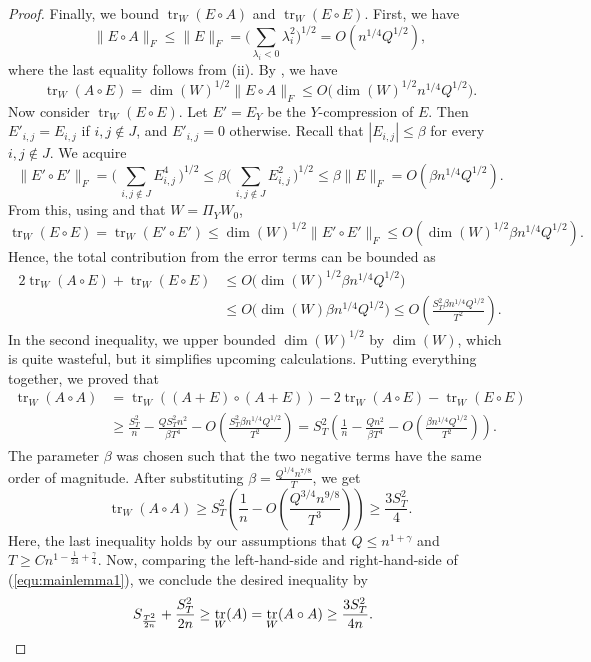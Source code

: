 \documentclass[10pt,a4paper]{amsart}
\DeclareMathOperator{\trace}{tr}
\begin{document}
\begin{proof}
Finally, we bound $\trace_W(E\circ A)$ and $\trace_W(E\circ E)$. First, we have 
$$\|E\circ A\|_F\leq \|E\|_F=\bigg(\sum_{\lambda_i<0}\lambda_i^2\bigg)^{1/2}=O(n^{1/4}Q^{1/2}),$$
where the last equality follows from  (ii). 
By , we have
$$\trace_W(A\circ E)=\dim(W)^{1/2} \|E\circ A\|_F\leq O\big(\dim(W)^{1/2}n^{1/4}Q^{1/2}\big).$$
Now consider $\trace_W(E\circ E)$.
Let $E'=E_Y$ be the $Y$-compression of $E$.
Then $E'_{i,j}=E_{i,j}$ if $i,j\not\in J$, and $E'_{i,j}=0$ otherwise. 
Recall that $|E_{i,j}| \le \beta$ for every $i,j \notin J$. We acquire
\begin{equation} \nonumber
    \|E'\circ E'\|_F
    =\bigg(\,\sum_{i,j\not\in J} E_{i,j}^4\,\bigg)^{1/2}
    \leq \beta \bigg(\,\sum_{i,j\not\in J}E_{i,j}^2\,\bigg)^{1/2}
    \leq \beta \|E\|_F=O(\beta n^{1/4}Q^{1/2}).
\end{equation}
From this, using  and that $W=\Pi_{Y} W_0$,
$$\trace_W(E\circ E)=\trace_W(E'\circ E')
    \leq \dim(W)^{1/2}\|E'\circ E'\|_F
    \leq O(\dim(W)^{1/2}\beta n^{1/4}Q^{1/2}).$$
Hence, the total contribution from the error terms can be bounded as
\begin{align*}
    2\trace_W(A\circ E)+\trace_W(E\circ E)
    &\leq O\big(\dim(W)^{1/2}\beta n^{1/4}Q^{1/2} \big)\\
    &\leq  O\big(\dim(W)\beta n^{1/4}Q^{1/2} \big)
    \leq O\!\left(\frac{S_T^2\beta n^{1/4}Q^{1/2}}{T^2}\right).
\end{align*}
In  the second inequality, we upper bounded $\dim(W)^{1/2}$ by $\dim(W)$, which is quite wasteful, but it simplifies upcoming calculations. Putting everything together, we proved that 
\begin{align*}
\trace_W(A\circ A)&=\trace_W((A+E)\circ (A+E))-2\trace_W(A\circ E)-\trace_W(E\circ E)\\
&\geq \frac{S_T^2}{n}-\frac{QS_T^2n^2}{\beta T^4}-O\left(\frac{S_T^2\beta n^{1/4}Q^{1/2}}{T^2}\right)=S_T^2\left(\frac{1}{n}-\frac{Qn^2}{\beta T^4}-O\left(\frac{\beta n^{1/4}Q^{1/2}}{T^2}\right)\right).
\end{align*}
The parameter $\beta$ was chosen such that the two negative terms have the same order of magnitude. After substituting $\beta=\frac{Q^{1/4}n^{7/8}}{T}$, we get
$$\trace_W(A\circ A) \ge S_T^2\left(\frac{1}{n}-O\left(\frac{Q^{3/4}n^{9/8}}{T^3}\right)\right)\geq \frac{3S_T^2}{4}.$$
Here, the last inequality holds by our assumptions that $Q\leq n^{1+\gamma}$ and $T\geq Cn^{1-\frac{1}{24}+\frac{\gamma}{4}}$. 
Now, comparing the left-hand-side and right-hand-side of (\ref{equ:mainlemma1}), we conclude the desired inequality by 
\begin{align}
S_{\frac{T^2}{2n}} + \frac{S_T^2}{2n} &\ge \trace_W(A) = \trace_W(A\circ A)
\geq \frac{3S_T^2}{4n}. \qedhere
\end{align}
\end{proof}
\end{document}
